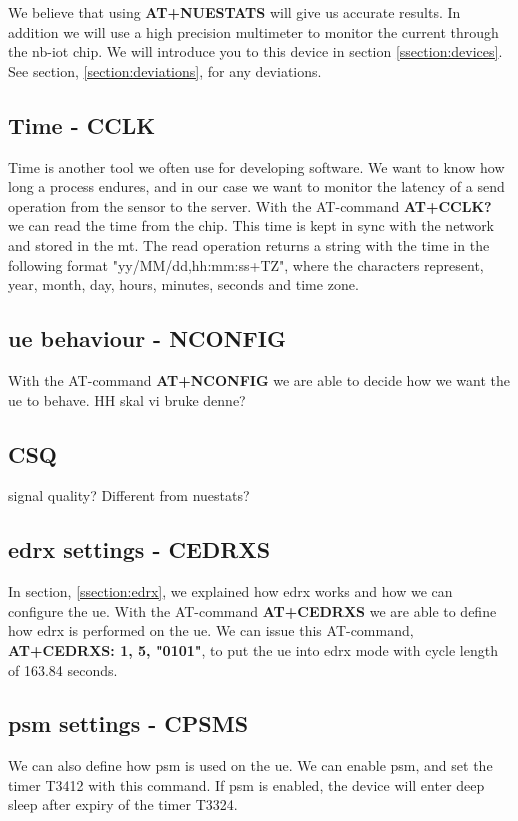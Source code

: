 \documentclass[USenglish]{ifimaster}  %
\begin{document}
We believe that using \textbf{AT+NUESTATS} will give us accurate results. In addition we will use a high precision multimeter to monitor the current through the \acrshort{nb-iot} chip. We will introduce you to this device in section \vref{ssection:devices}. See section, \vref{section:deviations}, for any deviations.

\subsection{Time - CCLK}
Time is another tool we often use for developing software. We want to know how long a process endures, and in our case we want to monitor the latency of a send operation from the sensor to the server. With the AT-command \textbf{AT+CCLK?} we can read the time from the chip. This time is kept in sync with the network and stored in the \acrshort{mt}. The read operation returns a string with the time in the following format "yy/MM/dd,hh:mm:ss+TZ", where the characters represent, year, month, day, hours, minutes, seconds and time zone.

\subsection{\acrshort{ue} behaviour - NCONFIG}
With the AT-command \textbf{AT+NCONFIG} we are able to decide how we want the \acrshort{ue} to behave. HH skal vi bruke denne?

\subsection{CSQ} signal quality? Different from nuestats?

\subsection{\acrshort{edrx} settings - CEDRXS}
In section, \vref{ssection:edrx}, we explained how \acrshort{edrx} works and how we can configure the \acrshort{ue}. With the AT-command \textbf{AT+CEDRXS} we are able to define how \acrshort{edrx} is performed on the \acrshort{ue}. We can issue this AT-command, \textbf{AT+CEDRXS: 1, 5, "0101"}, to put the \acrshort{ue} into \acrshort{edrx} mode with cycle length of 163.84 seconds.

\subsection{\acrshort{psm} settings - CPSMS}
We can also define how \acrshort{psm} is used on the \acrshort{ue}. We can enable \acrshort{psm}, and set the timer \acrfull{T3412} with this command. If \acrshort{psm} is enabled, the device will enter deep sleep after expiry of the timer \acrfull{T3324}.
\end{document}
